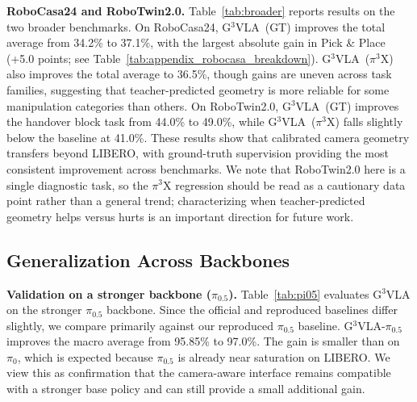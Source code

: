 \documentclass{article}
\begin{document}
\textbf{RoboCasa24 and RoboTwin2.0.} Table~\ref{tab:broader} reports results on
the two broader benchmarks. On RoboCasa24, G$^3$VLA~(GT) improves the total
average from 34.2\% to 37.1\%, with the largest absolute gain in Pick \& Place (+5.0 points; see Table~\ref{tab:appendix_robocasa_breakdown}). G$^3$VLA~($\pi^3$X) also improves the total average to 36.5\%,
though gains are uneven across task families, suggesting that teacher-predicted
geometry is more reliable for some manipulation categories than others. On
RoboTwin2.0, G$^3$VLA~(GT) improves the handover block task from 44.0\% to
49.0\%, while G$^3$VLA~($\pi^3$X) falls slightly below the baseline at 41.0\%.
These results show that calibrated camera geometry transfers
beyond LIBERO, with ground-truth supervision providing the most consistent
improvement across benchmarks. We note that RoboTwin2.0 here is a single
diagnostic task, so the $\pi^3$X regression should be read as a cautionary data
point rather than a general trend; characterizing when teacher-predicted
geometry helps versus hurts is an important direction for future work.

\subsection{Generalization Across Backbones}

\textbf{Validation on a stronger backbone ($\pi_{0.5}$).} 
Table~\ref{tab:pi05} evaluates G$^3$VLA on the stronger $\pi_{0.5}$ backbone.
Since the official and reproduced baselines differ slightly, we compare primarily
against our reproduced $\pi_{0.5}$ baseline. G$^3$VLA-$\pi_{0.5}$ improves the
macro average from 95.85\% to 97.0\%. The gain is
smaller than on $\pi_0$, which is expected because $\pi_{0.5}$ is already near
saturation on LIBERO. We view this as confirmation that the camera-aware
interface remains compatible with a stronger base policy and can still provide a
small additional gain.
\end{document}

